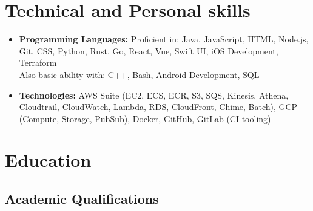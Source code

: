 \documentclass[11pt,a4paper,roman]{moderncv}        %
\begin{document}



\vspace{2pt}

\section{Technical and Personal skills}

\vspace{2pt}

\begin{itemize}

\item \textbf{Programming Languages:} Proficient in: Java, JavaScript, HTML, Node.js, Git, CSS, Python, Rust, Go, React, Vue, Swift UI, iOS Development, Terraform \\ Also basic ability with: C++, Bash, Android Development, SQL
\item \textbf{Technologies:} AWS Suite (EC2, ECS, ECR, S3, SQS, Kinesis, Athena, Cloudtrail, CloudWatch, Lambda, RDS, CloudFront, Chime, Batch), GCP (Compute, Storage, PubSub), Docker, GitHub, GitLab (CI tooling)

\vspace{2pt}

\end{itemize}

\vspace{2pt}


\section{Education}

\vspace{0pt}

\subsection{Academic Qualifications}
\end{document}

